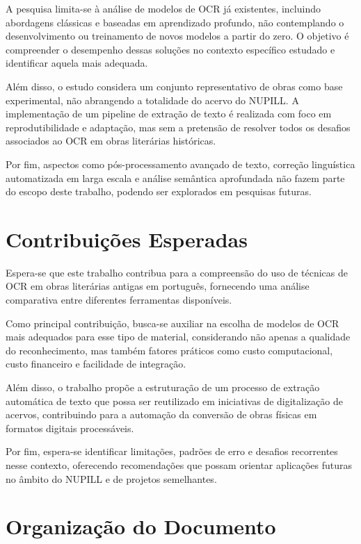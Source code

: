 \documentclass[
  12pt,
  oneside,
  a4paper,
  chapter=TITLE,
  section=TITLE,
  english,
  brazil
]{abntex2}
\begin{document}
A pesquisa limita-se à análise de modelos de OCR já existentes, incluindo abordagens
clássicas e baseadas em aprendizado profundo, não contemplando o desenvolvimento ou
treinamento de novos modelos a partir do zero. O objetivo é compreender o desempenho
dessas soluções no contexto específico estudado e identificar aquela mais adequada.

Além disso, o estudo considera um conjunto representativo de obras como base
experimental, não abrangendo a totalidade do acervo do NUPILL. A implementação de um
pipeline de extração de texto é realizada com foco em reprodutibilidade e adaptação,
mas sem a pretensão de resolver todos os desafios associados ao OCR em obras literárias
históricas.

Por fim, aspectos como pós-processamento avançado de texto, correção linguística
automatizada em larga escala e análise semântica aprofundada não fazem parte do escopo
deste trabalho, podendo ser explorados em pesquisas futuras.

\section{Contribuições Esperadas}

Espera-se que este trabalho contribua para a compreensão do uso de técnicas de OCR em
obras literárias antigas em português, fornecendo uma análise comparativa entre
diferentes ferramentas disponíveis.

Como principal contribuição, busca-se auxiliar na escolha de modelos de OCR mais
adequados para esse tipo de material, considerando não apenas a qualidade do
reconhecimento, mas também fatores práticos como custo computacional, custo financeiro
e facilidade de integração.

Além disso, o trabalho propõe a estruturação de um processo de extração automática de
texto que possa ser reutilizado em iniciativas de digitalização de acervos, contribuindo
para a automação da conversão de obras físicas em formatos digitais processáveis.

Por fim, espera-se identificar limitações, padrões de erro e desafios recorrentes nesse
contexto, oferecendo recomendações que possam orientar aplicações futuras no âmbito do
NUPILL e de projetos semelhantes.

\section{Organização do Documento}
\end{document}
